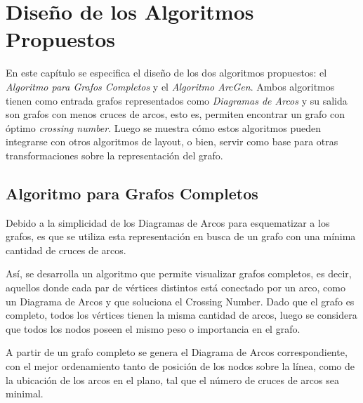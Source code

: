 \chapter{Diseño de los Algoritmos Propuestos}
\label{cap3}



En este capítulo se especifica el diseño de los dos algoritmos propuestos: el \emph{Algoritmo para Grafos Completos} y el \emph{Algoritmo ArcGen}. Ambos algoritmos tienen como  entrada grafos representados como \emph{Diagramas de Arcos} y su salida son grafos con menos cruces de arcos, esto es, permiten encontrar un grafo con óptimo \emph{crossing number}. Luego se muestra cómo estos algoritmos pueden integrarse con otros algoritmos de layout, o bien, servir como base para otras transformaciones sobre la representación del grafo.

\section{Algoritmo para Grafos Completos}
\label{sec:diseno_algoritmo_completo}
	Debido  a la  simplicidad de los Diagramas de Arcos para esquematizar a los  grafos,  es que se  utiliza esta representación en busca de un grafo con una mínima cantidad de cruces de arcos.
	
	Así, se desarrolla  un algoritmo que permite visualizar  grafos  completos, es decir, aquellos donde cada par de vértices distintos está conectado por un arco, como un Diagrama de Arcos y que  soluciona el Crossing Number.
    Dado que el  grafo es completo, todos  los vértices tienen la misma cantidad de arcos,  luego se considera que todos los nodos poseen el mismo peso o importancia en el grafo. %

	
	
	A partir de un grafo completo se  genera  el  Diagrama de Arcos correspondiente, con  el mejor ordenamiento tanto de posición de los nodos sobre la línea, como de la ubicación de los arcos en el  plano,  tal que el número de cruces de arcos sea minimal.
	
